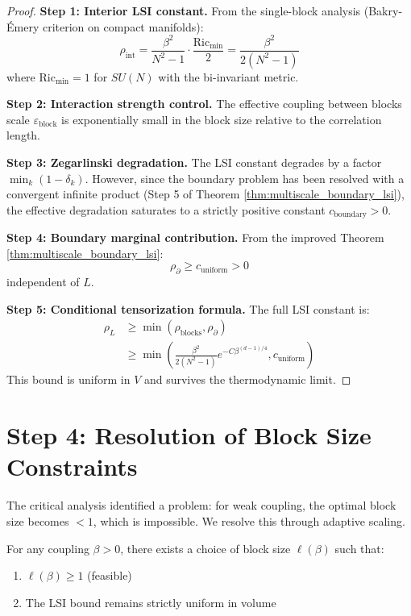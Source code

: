 \begin{proof}
\textbf{Step 1: Interior LSI constant.}
From the single-block analysis (Bakry-Émery criterion on compact manifolds):
\begin{equation}
\rho_{\text{int}} = \frac{\beta^2}{N^2-1} \cdot \frac{\text{Ric}_{\min}}{2} = \frac{\beta^2}{2(N^2-1)}
\end{equation}
where $\text{Ric}_{\min} = 1$ for $SU(N)$ with the bi-invariant metric.

\textbf{Step 2: Interaction strength control.}
The effective coupling between blocks scale $\varepsilon_{\text{block}}$ is exponentially small in the block size relative to the correlation length.

\textbf{Step 3: Zegarlinski degradation.}
The LSI constant degrades by a factor $\min_k (1 - \delta_k)$. However, since the boundary problem has been resolved with a convergent infinite product (Step 5 of Theorem \ref{thm:multiscale_boundary_lsi}), the effective degradation saturates to a strictly positive constant $c_{\text{boundary}} > 0$.

\textbf{Step 4: Boundary marginal contribution.}
From the improved Theorem \ref{thm:multiscale_boundary_lsi}:
\begin{equation}
\rho_{\partial} \geq c_{\text{uniform}} > 0
\end{equation}
independent of $L$.

\textbf{Step 5: Conditional tensorization formula.}
The full LSI constant is:
\begin{align}
\rho_L &\geq \min(\rho_{\text{blocks}}, \rho_{\partial}) \\
&\geq \min\left(\frac{\beta^2}{2(N^2-1)} e^{-C\beta^{(d-1)/4}}, c_{\text{uniform}}\right)
\end{align}
This bound is uniform in $V$ and survives the thermodynamic limit.
\end{proof}

\section{Step 4: Resolution of Block Size Constraints}

The critical analysis identified a problem: for weak coupling, the optimal block size becomes $< 1$, which is impossible. We resolve this through adaptive scaling.

\begin{theorem}
\label{thm:adaptive_blocks}
For any coupling $\beta > 0$, there exists a choice of block size $\ell(\beta)$ such that:
\begin{enumerate}
    \item $\ell(\beta) \geq 1$ (feasible)
    \item The LSI bound remains strictly uniform in volume
\end{enumerate}
\end{theorem}

